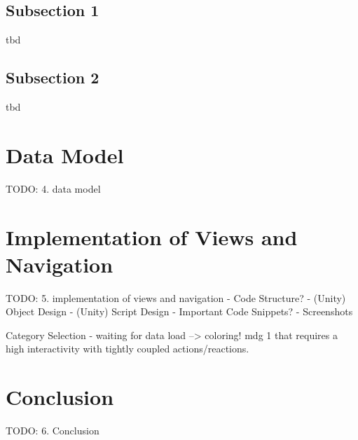 \subsection{Subsection 1}

tbd



\subsection{Subsection 2}

tbd



\section{Data Model}


TODO:
4. data model




\section{Implementation of Views and Navigation}


TODO:
5. implementation of views and navigation
- Code Structure?
- (Unity) Object Design
- (Unity) Script Design
- Important Code Snippets?
- Screenshots



Category Selection - waiting for data load --> coloring!
\gls{mdg} 1 that requires a high interactivity with tightly coupled actions/reactions.



\section{Conclusion}


TODO:
6. Conclusion



